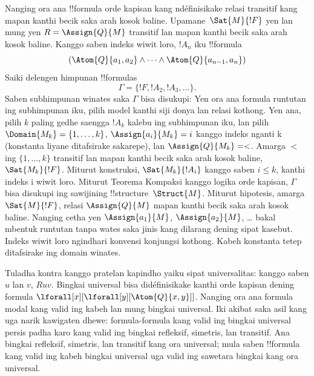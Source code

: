 \documentclass[../../../include/open-logic-section]{subfiles}
\begin{document}
Nanging ora ana !!{formula} orde kapisan kang
ndéfinisikake relasi transitif kang mapan kanthi becik saka arah
kosok baline. Upamane~$\Sat{M}{!F}$ yen lan mung yen $R =
\Assign{Q}{M}$ transitif lan mapan kanthi becik saka arah kosok
baline. Kanggo saben indeks wiwit loro, $!A_n$ iku !!{formula}
\[
(\Atom{Q}{a_1,a_2} \land \dots \land
    \Atom{Q}{a_{n-1},a_{n}})
\]
Saiki delengen himpunan !!{formula}s
\[
\Gamma = \{!F, !A_2, !A_3, \dots\}.
\]
Saben subhimpunan winates saka $\Gamma$ bisa disukupi: Yen ora ana
formula runtutan ing subhimpunan iku, pilih model kanthi siji donya lan
relasi kothong. Yen ana, pilih $k$ paling gedhe saengga $!A_k$ kalebu ing
subhimpunan iku, lan pilih $\Domain{M_k} = \{1, \dots, k\}$,
$\Assign{a_i}{M_k} = i$ kanggo indeks nganti k (konstanta liyane
ditafsirake sakarepe), lan $\Assign{Q}{M_k} = <$. Amarga $<$ ing
$\{1, \dots, k\}$ transitif lan mapan kanthi becik saka arah kosok
baline, $\Sat{M_k}{!F}$. Miturut konstruksi, $\Sat{M_k}{!A_i}$ kanggo
saben $i \le k$, kanthi indeks i wiwit loro. Miturut Teorema Kompaksi kanggo logika orde kapisan,
$\Gamma$ bisa disukupi ing sawijining !!{structure}~$\Struct{M}$.
Miturut hipotesis, amarga $\Sat{M}{!F}$, relasi $\Assign{Q}{M}$ mapan
kanthi becik saka arah kosok baline. Nanging cetha yen
$\Assign{a_1}{M}$, $\Assign{a_2}{M}$, \dots{} bakal mbentuk runtutan
tanpa wates saka jinis kang dilarang dening sipat kasebut. Indeks wiwit loro ngindhari konvensi konjungsi kothong. Kabeh konstanta tetep ditafsirake ing domain winates.

Tuladha kontra kanggo pratelan kapindho yaiku sipat
universalitas: kanggo saben $u$ lan $v$, $Ruv$. Bingkai universal bisa
didéfinisikake kanthi orde kapisan dening formula
$\lforall[x][\lforall[y][\Atom{Q}{x,y}]]$. Nanging ora ana formula
modal kang valid ing kabeh lan mung bingkai universal. Iki akibat saka
asil kang uga narik kawigaten dhewe: formula-formula kang valid ing
bingkai universal persis padha karo kang valid ing bingkai refleksif,
simetris, lan transitif. Ana bingkai refleksif, simetris, lan
transitif kang ora universal; mula saben !!{formula} kang valid ing
kabeh bingkai universal uga valid ing sawetara bingkai kang ora
universal.
\end{document}
